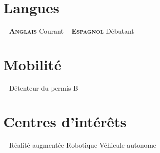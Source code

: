 \documentclass[]{friggeri-cv-cust}
\begin{document}
\begin{asidep2}
  \section{Langues}
    ~
    \textbf{\textsc{Anglais}}
    Courant
    ~
    \textbf{\textsc{Espagnol}}
    Débutant 
    ~    
  \section{Mobilité}
    ~
    Détenteur du permis B
    ~    
  \section{Centres d'intérêts}
    ~
  Réalité augmentée
  Robotique
  Véhicule autonome
\end{asidep2}
\end{document}
